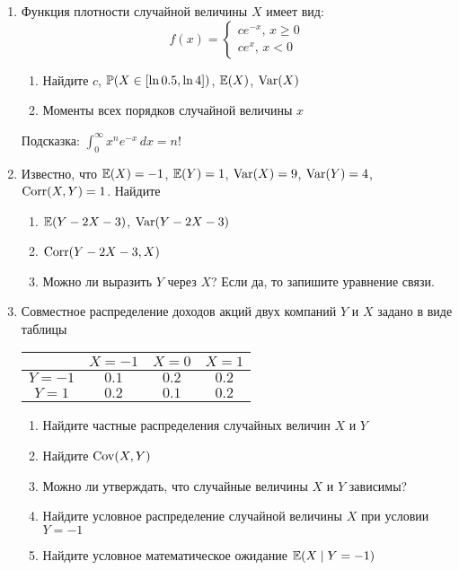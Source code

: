 \begin{enumerate}
\item Функция плотности случайной величины $X$ имеет вид:
\begin{equation}
f(x)=\begin{cases}
ce^{-x}, \, x\geq 0 \\
ce^x, \, x<0
\end{cases}
\end{equation}
\begin{enumerate}
\item Найдите $c$, $\P(X \in [\ln 0.5,\ln 4])$, $\E(X)$, $\Var(X)$
\item Моменты всех порядков случайной величины $x$
\end{enumerate}

Подсказка: $\int_0^{\infty} x^n e^{-x} \, dx=n!$

\item Известно, что  $\E(X)=-1$, $\E(Y)=1$, $\Var(X)=9$, $\Var(Y)=4$, $\Corr(X,Y)=1$. Найдите
\begin{enumerate}
\item $\E(Y-2X-3)$, $\Var(Y-2X-3)$
\item  $\Corr(Y-2X-3,X)$
\item Можно ли выразить $Y$ через $X$? Если да, то запишите уравнение связи.
\end{enumerate}

\item Совместное распределение доходов акций двух компаний $Y$ и $X$ задано в виде таблицы

\begin{tabular}{@{}c|ccc@{}}
\toprule
    & $X=-1$ & $X=0$ & $X=1$ \\ \midrule
$Y=-1$ & $0.1$  & $0.2$   & $0.2$ \\
$Y=1$ & $0.2$  & $0.1$ & $0.2$ \\ \bottomrule
\end{tabular}

\begin{enumerate}
\item Найдите  частные распределения случайных величин $X$ и $Y$
\item Найдите $\Cov(X,Y)$
\item Можно ли утверждать, что случайные величины $X$ и $Y$ зависимы?
\item Найдите условное распределение случайной величины $X$ при условии $Y=-1$
\item Найдите условное математическое ожидание $\E(X\mid Y=-1)$
\end{enumerate}


\end{enumerate}



